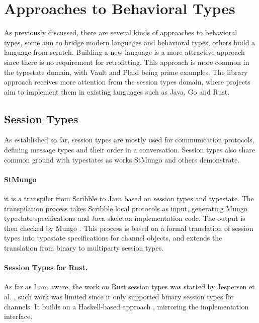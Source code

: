\section{Approaches to Behavioral Types}\label{sec:behavioral-approaches}

As previously discussed, there are several kinds of approaches to behavioral types,
some aim to bridge modern languages and behavioral types,
others build a language from scratch.
Building a new language is a more attractive approach since there is no requirement for retrofitting.
This approach is more common in the typestate domain, with Vault and Plaid being prime examples.
The library approach receives more attention from the session types domain,
where projects aim to implement them in existing languages such as Java, Go and Rust.

\subsection{Session Types}
As established so far, session types are mostly used for communication protocols,
defining message types and their order in a conversation.
Session types also share common ground with typestates as works StMungo \autocite{Dardha2017, Kouzapas2018, Voinea2020}
and others \autocite{Gay2015, Vasconcelos2017} demonstrate.

\paragraph{StMungo} it is a transpiler from Scribble \autocite{Yoshida2014} to Java based on session types and typestate.
The transpilation process takes Scribble local protocols as input, generating Mungo typestate specifications and Java skeleton implementation code.
The output is then checked by Mungo \autocite{Dardha2017, Kouzapas2018, Voinea2020}.
This process is based on a formal translation of session types into typestate specifications for channel objects, and
extends the translation from binary to multiparty session types.

\paragraph{Session Types for Rust.}
As far as I am aware, the work on Rust session types was started by Jespersen et al. \autocite{Jespersen2015},
such work was limited since it only supported binary session types for channels.
It builds on a Haskell-based approach \autocite{Pucella2008}, mirroring the implementation interface.

